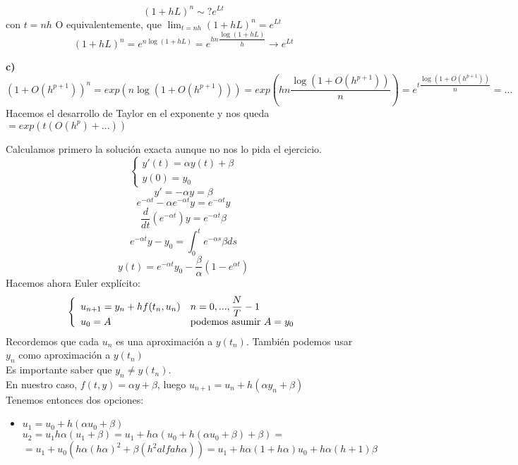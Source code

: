 \documentclass[openany]{book}
\begin{document}
    \setcounter{ex}{2}
    $$ (1+hL)^{n} \sim? e ^{Lt} $$
    con $ t = nh $
    O equivalentemente, que $ \lim_{t = nh} (1+hL)^{n} = e^{Lt}$
    $$ (1+hL)^{n} = e^{n \log(1+hL)} = e^{hn \dfrac{\log(1+hL)}{h}} \to e^{Lt} $$
    
    \textbf{c)}\\
    $$ (1+O(h^{p+1}))^{n} = exp(n \log(1+O(h ^{p+1}))) = exp(hn \dfrac{\log(1+O(h^{p+1}))}{n}) = e ^{t \dfrac{\log(1+O(h^{p+1}))}{n}} = ...$$
    Hacemos el desarrollo de Taylor en el exponente y nos queda $  = exp(t(O(h^{p})+...)) $
    
    \setcounter{ex}{9}
    \begin{exercise}
        Calculamos primero la solución exacta aunque no nos lo pida el ejercicio.
        $$ \left\{
        \begin{array}{l}
            y'(t) = \alpha y(t)+\beta\\
            y(0) = y_0
        \end{array}
        \right. $$
        $$ y' = -\alpha y = \beta $$
        $$ e^{-\alpha t}- \alpha e ^{-\alpha t} y = e ^{-\alpha t}y $$
        $$  \dfrac{d}{dt}(e^{-\alpha t }) y = e^{-\alpha t}\beta  $$
        $$ e^{-\alpha t}y -y_0 = \int_{0}^{t}e^{-\alpha s} \beta ds $$
        $$ y(t) = e^{-\alpha t} y_0 - \dfrac{\beta}{\alpha}(1-e^{\alpha t}) $$
        Hacemos ahora Euler explícito:
        $$ \left\{
        \begin{array}{ll}
            u_{n+1} = y_n +h f(t_n,u_n) & n=0,...,\dfrac{N}{T}-1\\
            u_0 = A & \text{podemos asumir $ A = y_0 $}
        \end{array}
        \right. $$
        Recordemos que cada $ u_n $ es una aproximación a $ y(t_n) $.
        También podemos usar $ y_n $ como aproximación a $ y(t_n) $\\
        Es importante saber que $ y_n \ne y(t_n) $.\\
        En nuestro caso, $ f(t,y) = \alpha y +\beta $, luego $ u_{n+1} = u_n+h(\alpha y_n+\beta) $\\
        Tenemos entonces dos opciones:
        \begin{itemize}
            \item $ u_1=u_0+h(\alpha u_0+\beta) $\\
            $ u_2 =  u_1h \alpha( u_1+\beta) = u_1+h \alpha(u_0+h(\alpha u_0+\beta)+\beta) = $\\$ = u_1 + u_0 (h \alpha(h \alpha)^2+\beta (h^2alfa h \alpha)) = u_1 +h \alpha (1+h \alpha ) u_0+h \alpha (h+1) \beta$

\end{itemize}
\end{exercise}
\end{document}
